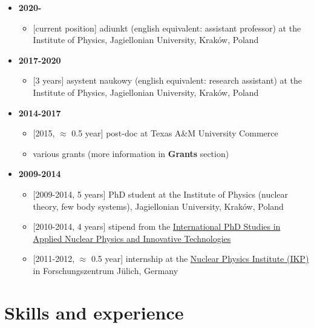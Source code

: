 \documentclass{article}
\providecommand{\tightlist}{%
  \setlength{\itemsep}{0pt}\setlength{\parskip}{0pt}}
\begin{document}
\begin{itemize}
\tightlist
\item
  \textbf{2020-}

  \begin{itemize}
  \tightlist
  \item
    {[}current position{]} adiunkt (english equivalent: assistant
    professor) at the Institute of Physics, Jagiellonian University,
    Kraków, Poland
  \end{itemize}
\item
  \textbf{2017-2020}

  \begin{itemize}
  \tightlist
  \item
    {[}3 years{]} asystent naukowy (english equivalent: research
    assistant) at the Institute of Physics, Jagiellonian University,
    Kraków, Poland
  \end{itemize}
\item
  \textbf{2014-2017}

  \begin{itemize}
  \tightlist
  \item
    {[}2015, \(\approx\) 0.5 year{]} post-doc at Texas A\&M University
    Commerce
  \item
    various grants (more information in \textbf{Grants} section)
  \end{itemize}
\item
  \textbf{2009-2014}

  \begin{itemize}
  \tightlist
  \item
    {[}2009-2014, 5 years{]} PhD student at the Institute of Physics
    (nuclear theory, few body systems), Jagiellonian University, Kraków,
    Poland
  \item
    {[}2010-2014, 4 years{]} stipend from the
    \href{https://fais.uj.edu.pl/applied-nuclear-physics-and-innovative-technologies}{International
    PhD Studies in Applied Nuclear Physics and Innovative Technologies}
  \item
    {[}2011-2012, \(\approx\) 0.5 year{]} internship at the
    \href{https://www.fz-juelich.de/ikp/EN/Home/home_node.html}{Nuclear
    Physics Institute (IKP)} in Forschungszentrum Jülich, Germany
  \end{itemize}
\end{itemize}

\hypertarget{skills-and-experience}{%
\section{Skills and experience}\label{skills-and-experience}}
\end{document}
